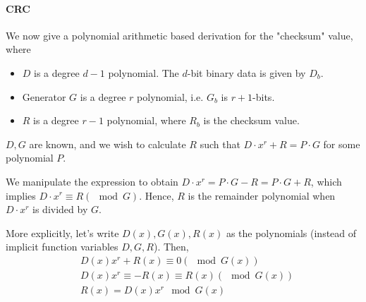 \documentclass[a4paper]{article}
\begin{document}
\paragraph{CRC} We now give a polynomial arithmetic based derivation for the "checksum" value, where
\begin{itemize}
	\item $D$ is a degree $d-1$ polynomial. The $d$-bit binary data is given by $D_b$.
	\item Generator $G$ is a degree $r$ polynomial, i.e. $G_b$ is $r+1$-bits.
	\item $R$ is a degree $r-1$ polynomial, where $R_b$ is the checksum value.
\end{itemize}
$D, G$ are known, and we wish to calculate $R$ such that $D\cdot x^r + R = P\cdot G$ for some polynomial $P$.

We manipulate the expression to obtain $D\cdot x^r = P\cdot G - R = P\cdot G + R$, which implies $D\cdot x^r\equiv R (\mod G)$. Hence, $R$ is the remainder polynomial when $D\cdot x^r$ is divided by $G$.

More explicitly, let's write $D(x), G(x), R(x)$ as the polynomials (instead of implicit function variables $D, G, R$). Then,
\begin{equation}
\begin{aligned}
&D(x)x^r + R(x)\equiv 0(\mod G(x))\\
&D(x)x^r\equiv -R(x)\equiv R(x)(\mod G(x))\\
&R(x) = D(x)x^r\mod G(x)
\end{aligned}
\end{equation}
\end{document}
